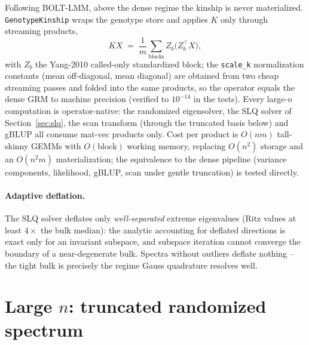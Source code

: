 \documentclass[11pt]{article}
\begin{document}
Following BOLT-LMM, above the dense regime the kinship is
never materialized. \texttt{GenotypeKinship} wraps the genotype store and
applies $K$ only through streaming products,
\begin{equation}
  K X \;=\; \frac{1}{m}\sum_{\text{blocks}} Z_b \bigl(Z_b^\top X\bigr),
\end{equation}
with $Z_b$ the Yang-2010 called-only standardized block; the
\texttt{scale\_k} normalization constants (mean off-diagonal, mean
diagonal) are obtained from two cheap streaming passes and folded into
the same products, so the operator equals the dense GRM to machine
precision (verified to $10^{-14}$ in the tests). Every large-$n$
computation is operator-native: the randomized eigensolver, the SLQ
solver of Section~\ref{sec:slq}, the scan transform (through the
truncated basis below) and gBLUP all consume mat-vec products only.
Cost per product is $O(nm)$ tall-skinny GEMMs with $O(\text{block})$
working memory, replacing $O(n^2)$ storage and an $O(n^2 m)$
materialization; the equivalence to the dense pipeline (variance
components, likelihood, gBLUP, scan under gentle truncation) is tested
directly.

\paragraph{Adaptive deflation.} The SLQ solver deflates only
\emph{well-separated} extreme eigenvalues (Ritz values at least
$4\times$ the bulk median): the analytic accounting for deflated
directions is exact only for an invariant subspace, and subspace
iteration cannot converge the boundary of a near-degenerate bulk.
Spectra without outliers deflate nothing -- the tight bulk is precisely
the regime Gauss quadrature resolves well.

\section{Large \texorpdfstring{$n$}{n}: truncated randomized spectrum}
\label{sec:topk}
\end{document}
